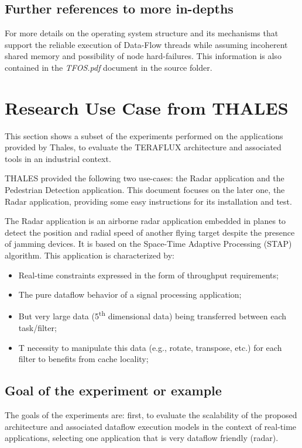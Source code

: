 \documentclass[a4paper]{article}
\begin{document}
\subsection[Further references to more in{}-depths]{Further references
to more in-depths}
{
For more details on the operating system structure and its mechanisms
that support the reliable execution of Data-Flow threads while assuming
incoherent shared memory and possibility of node hard-failures. This
information is also contained in the \textit{TFOS.pdf} document in the
source folder.}

\section[Research Use Case from THALES]{Research Use Case from THALES}
{
This section shows a subset of the experiments performed on the
applications provided by Thales, to evaluate the TERAFLUX architecture
and associated tools in an industrial context. }

{
THALES provided the following two use-cases: the Radar application and
the Pedestrian Detection application. This document focuses on the
later one, the Radar application, providing some easy instructions for
its installation and test. }

{
The Radar application is an airborne radar application embedded in
planes to detect the position and radial speed of another flying target
despite the presence of jamming devices. It is based on the Space-Time
Adaptive Processing (STAP) algorithm. This application is characterized
by:}

\begin{itemize}
\item {
Real-time constraints expressed in the form of throughput requirements;}
\item {
The pure dataflow behavior of a signal processing application;}
\item {
But very large data (5\textsuperscript{th} dimensional data) being
transferred between each task/filter;}
\item {
T necessity to manipulate this data (e.g., rotate, transpose, etc.) for
each filter to benefits from cache locality;}
\end{itemize}
\subsection[Goal of the experiment or example]{Goal of the experiment or
example}
{
The goals of the experiments are: first, to evaluate the scalability of
the proposed architecture and associated dataflow execution models in
the context of real-time applications, selecting one application that
is very dataflow friendly (radar).}
\end{document}
